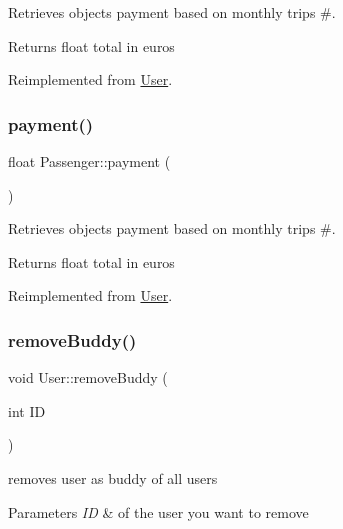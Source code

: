 Retrieves object\textquotesingle{}s payment based on monthly trips \#. 

\begin{DoxyReturn}{Returns}
float total in euros 
\end{DoxyReturn}


Reimplemented from \hyperlink{group___user_gac8563338d1d8086cd5485ad8c1ed4499}{User}.

\mbox{\label{group___user_ga9535b6486d1f33f055d6c7385780ec68}} 
\subsubsection{\texorpdfstring{payment()}{payment()}\hspace{0.1cm}{\footnotesize\ttfamily [3/3]}}
{\footnotesize\ttfamily float Passenger\+::payment (\begin{DoxyParamCaption}{ }\end{DoxyParamCaption})\hspace{0.3cm}{\ttfamily [virtual]}}



Retrieves object\textquotesingle{}s payment based on monthly trips \#. 

\begin{DoxyReturn}{Returns}
float total in euros 
\end{DoxyReturn}


Reimplemented from \hyperlink{group___user_gac8563338d1d8086cd5485ad8c1ed4499}{User}.

\mbox{\label{group___user_ga280617ba3ac500d59e6eb8af09dc3487}} 
\subsubsection{\texorpdfstring{remove\+Buddy()}{removeBuddy()}}
{\footnotesize\ttfamily void User\+::remove\+Buddy (\begin{DoxyParamCaption}\item[{int}]{ID }\end{DoxyParamCaption})}



removes user as buddy of all users 


\begin{DoxyParams}{Parameters}
{\em ID} & of the user you want to remove \\
\hline
\end{DoxyParams}
\mbox{\label{group___user_ga02324144fd363369f11b7aca8f117865}} 
